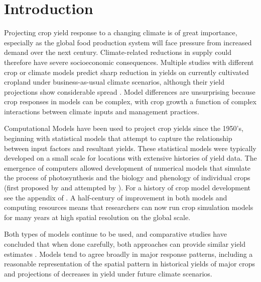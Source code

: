 \documentclass[preprint, 5p, times, twocolumn]{elsarticle}
\begin{document}
\modulolinenumbers[1]
\linenumbers
\section{Introduction}
\label{S:1}

Projecting crop yield response to a changing climate is of great importance, especially as the global food production system will face pressure from increased demand over the next century. Climate-related reductions in supply could therefore have severe socioeconomic consequences. Multiple studies with different crop or climate models predict sharp reduction in yields on currently cultivated cropland under {business-as-usual} climate scenarios, although their yield projections show considerable spread \citep[e.g.][and references therein]{porter2014, Rosenzweig2014, Schauberger2017}. Model differences are unsurprising because crop responses in models can be complex, with crop growth a function of complex interactions between climate inputs and management practices. 

Computational Models have been used to project crop yields since the 1950's, beginning with statistical models \citep{Heady57, Heady61} that attempt to capture the relationship between input factors and resultant yields. These statistical models were typically developed on a small scale for locations with extensive histories of yield data. The emergence of computers allowed development of numerical models that simulate the process of photosynthesis and the biology and phenology of individual crops (first proposed by \citet{wit58, Duncan67} and attempted by \citet{Duncan72}). For a history of crop model development see the appendix of \citet{Rosenzweig2014}. A half-century of improvement in both models and computing resources means that researchers can now run crop simulation models for many years at high spatial resolution on the global scale. 

Both types of models continue to be used, and comparative studies have concluded that when done carefully, both approaches can provide similar yield estimates \citep[e.g.][]{Lobell2010, Moore2017, Roberts2017, zhao2017}. Models tend to agree broadly in major response patterns, including a reasonable representation of the spatial pattern in historical yields of major crops \citep[e.g.][]{Elliott2015, muller_global_2017} and projections of decreases in yield under future climate scenarios.
\end{document}
